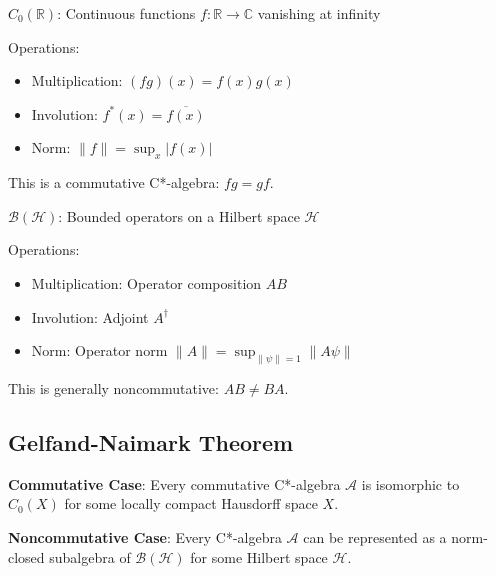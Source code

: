 \begin{example}\label{ex:commutative-c-star}
$C_0(\mathbb{R})$: Continuous functions $f: \mathbb{R} \to \mathbb{C}$ vanishing at infinity

Operations:
\begin{itemize}
\item Multiplication: $(fg)(x) = f(x)g(x)$
\item Involution: $f^*(x) = \overline{f(x)}$
\item Norm: $\| f \| = \sup_{x} |f(x)|$
\end{itemize}

This is a commutative C*-algebra: $fg = gf$.
\end{example}

\begin{example}\label{ex:noncommutative-c-star}
$\mathcal{B}(\mathcal{H})$: Bounded operators on a Hilbert space $\mathcal{H}$

Operations:
\begin{itemize}
\item Multiplication: Operator composition $AB$
\item Involution: Adjoint $A^\dagger$
\item Norm: Operator norm $\| A \| = \sup_{\| \psi \| = 1} \| A\psi \|$
\end{itemize}

This is generally noncommutative: $AB \neq BA$.
\end{example}

\subsection{Gelfand-Naimark Theorem}

\begin{theorem}\label{thm:gelfand-naimark}
\textbf{Commutative Case}: Every commutative C*-algebra $\mathcal{A}$ is isomorphic to $C_0(X)$ for some locally compact Hausdorff space $X$\cite{gelfand1943,connes_noncommutative_1994}.

\textbf{Noncommutative Case}: Every C*-algebra $\mathcal{A}$ can be represented as a norm-closed subalgebra of $\mathcal{B}(\mathcal{H})$ for some Hilbert space $\mathcal{H}$.
\end{theorem}

